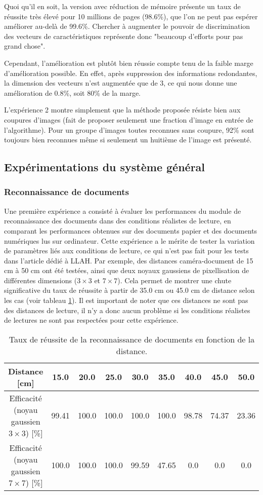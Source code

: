 \documentclass[a4paper]{article}
\begin{document}
Quoi qu'il en soit, la version avec réduction de mémoire présente un taux de réussite très élevé pour 10 millions de pages (98.6\%), que l'on ne peut pas espérer améliorer au-delà de 99.6\%. Chercher à augmenter le pouvoir de discrimination des vecteurs de caractéristiques représente donc "beaucoup d'efforts pour pas grand chose".

Cependant, l'amélioration est plutôt bien réussie compte tenu de la faible marge d'amélioration possible. En effet, après suppression des informations redondantes, la dimension des vecteurs n'est augmentée que de 3, ce qui nous donne une amélioration de 0.8\%, soit 80\% de la marge.

L'expérience 2 montre simplement que la méthode proposée résiste bien aux coupures d'images (fait de proposer seulement une fraction d'image en entrée de l'algorithme). Pour un groupe d'images toutes reconnues sans coupure, 92\% sont toujours bien reconnues même si seulement un huitième de l'image est présenté.

\subsection{Expérimentations du système général}

\subsubsection{Reconnaissance de documents}
Une première expérience a consisté à évaluer les performances du module de reconnaissance des documents dans des conditions réalistes de lecture, en comparant les performances obtenues sur des documents papier et des documents numériques lus sur ordinateur. Cette expérience a le mérite de tester la variation de paramètres liés aux conditions de lecture, ce qui n'est pas fait pour les tests dans l'article dédié à LLAH. Par exemple, des distances caméra-document de 15 cm à 50 cm ont été testées, ainsi que deux noyaux gaussiens de pixellisation de différentes dimensions ($3 \times 3$ et $7 \times 7$). Cela permet de montrer une chute significative du taux de réussite à partir de 35.0 cm ou 45.0 cm de distance selon les cas (voir tableau \ref{tab:results}). Il est important de noter que ces distances ne sont pas des distances de lecture, il n'y a donc aucun problème si les conditions réalistes de lectures ne sont pas respectées pour cette expérience. 

\begin{table}[!h]
\begin{tabular}{c|c|c|c|c|c|c|c|c}
Distance [cm] & 15.0 & 20.0 & 25.0 & 30.0 & 35.0 & 40.0 & 45.0 & 50.0 \\\hline
Efficacité (noyau gaussien $3 \times 3$) [\%] & 99.41 & 100.0 & 100.0 & 100.0 & 100.0 & 98.78 & 74.37 & 23.36 \\\hline
Efficacité (noyau gaussien $7 \times 7$) [\%] & 100.0 & 100.0 & 100.0 & 99.59 & 47.65 & 0.0 & 0.0 & 0.0
\end{tabular}
\caption{\label{tab:results}Taux de réussite de la reconnaissance de documents en fonction de la distance.}
\end{table}
\end{document}
